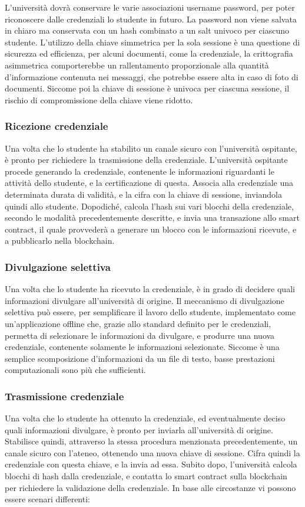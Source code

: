 \documentclass[a4paper,12pt]{article}
\begin{document}
\newline L'università dovrà conservare le varie associazioni username password, per poter riconoscere dalle credenziali lo studente in futuro. La password non viene salvata in chiaro ma conservata con un hash combinato a un salt univoco per ciascuno studente.
\newline L'utilizzo della chiave simmetrica per la sola sessione è una questione di sicurezza ed efficienza, per alcuni documenti, come la credenziale, la crittografia asimmetrica comporterebbe un rallentamento proporzionale alla quantità d'informazione contenuta nei messaggi, che potrebbe essere alta in caso di foto di documenti. Siccome poi la chiave di sessione è univoca per ciascuna sessione, il rischio di compromissione della chiave viene ridotto.
\subsubsection{Ricezione credenziale}
Una volta che lo studente ha stabilito un canale sicuro con l'università ospitante, è pronto per richiedere la trasmissione della credenziale. L'università ospitante procede generando la credenziale, contenente le informazioni riguardanti le attività dello studente, e la certificazione di questa. Associa alla credenziale una determinata durata di validità, e la cifra con la chiave di sessione, inviandola quindi allo studente. Dopodiché, calcola l'hash sui vari blocchi della credenziale, secondo le modalità precedentemente descritte, e invia una transazione allo smart contract, il quale provvederà a generare un blocco con le informazioni ricevute, e a pubblicarlo nella blockchain.
\subsubsection{Divulgazione selettiva}
Una volta che lo studente ha ricevuto la credenziale, è in grado di decidere quali informazioni divulgare all'università di origine. Il meccanismo di divulgazione selettiva può essere, per semplificare il lavoro dello studente, implementato come un'applicazione offline che, grazie allo standard definito per le credenziali, permetta di selezionare le informazioni da divulgare, e produrre una nuova credenziale, contenente solamente le informazioni selezionate.
\newline Siccome è una semplice scomposizione d'informazioni da un file di testo, basse prestazioni computazionali sono più che sufficienti.
\subsubsection{Trasmissione credenziale}
Una volta che lo studente ha ottenuto la credenziale, ed eventualmente deciso quali informazioni divulgare, è pronto per inviarla all'università di origine. Stabilisce quindi, attraverso la stessa procedura menzionata precedentemente, un canale sicuro con l'ateneo, ottenendo una nuova chiave di sessione. Cifra quindi la credenziale con questa chiave, e la invia ad essa. Subito dopo, l'università calcola blocchi di hash dalla credenziale, e contatta lo smart contract sulla blockchain per richiedere la validazione della credenziale.
\newline In base alle circostanze vi possono essere scenari differenti:
\end{document}
